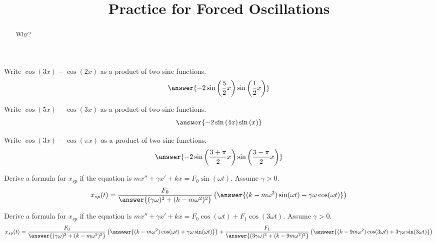 \documentclass{ximera}
\title{Practice for Forced Oscillations}
\begin{document}
\begin{abstract}
    Why?
\end{abstract}
\maketitle

 

\begin{exercise}
    Write $\cos(3x) - \cos(2x)$ as a product of two sine functions.
    \[
        \answer{-2\sin\left(\frac{5}{2}x\right)\sin\left(\frac{1}{2}x\right)}
    \]
\end{exercise}

\begin{exercise}
    Write $\cos(5x) - \cos(3x)$ as a product of two sine functions.
    \[
        \answer{-2\sin\left(4x\right)\sin\left(x\right)}
    \]
\end{exercise}

\begin{exercise}
    Write $\cos(3x) - \cos(\pi x)$ as a product of two sine functions.
    \[
        \answer{-2\sin\left(\frac{3+\pi}{2}x\right)\sin\left(\frac{3-\pi}{2}x\right)}
    \]
\end{exercise}

\begin{exercise}
    Derive a formula for $x_{sp}$ if the equation is $m x'' + \gamma x' + kx = F_0 \sin (\omega t)$.  Assume $\gamma > 0$.
    \[
        x_{sp}(t) = \frac{F_0}{\answer{(\gamma \omega)^2 + (k - m\omega^2)^2}}\left(\answer{ (k - m\omega^2)\sin(\omega t) - \gamma \omega \cos(\omega t)}\right)
    \]
\end{exercise}

\begin{exercise}
    Derive a formula for $x_{sp}$ if the equation is $m x'' + \gamma x' + kx = F_0 \cos (\omega t) + F_1 \cos (3\omega t)$. Assume $\gamma > 0$.
    \[
        x_{sp}(t) = \frac{F_0}{\answer{(\gamma \omega)^2 + (k - m\omega^2)^2}}\left(\answer{ (k - m\omega^2)\cos(\omega t) + \gamma \omega \sin(\omega t)}\right)
        + \frac{F_1}{\answer{(3\gamma \omega)^2 + (k - 9m\omega^2)^2}}\left(\answer{(k -9 m\omega^2)\cos(3\omega t) + 3\gamma \omega \sin(3\omega t)}\right)
    \]
\end{exercise}
\end{document}
